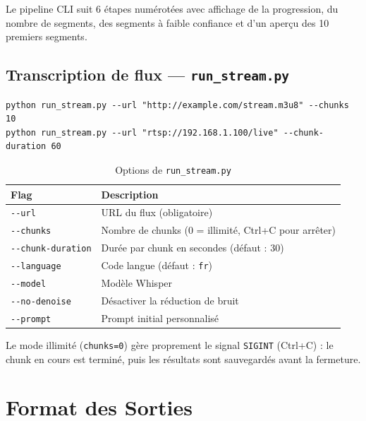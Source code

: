 \documentclass[12pt,a4paper]{report}
\begin{document}
Le pipeline CLI suit 6 étapes numérotées avec affichage de la progression, du nombre de segments, des segments à faible confiance et d'un aperçu des 10 premiers segments.

\section{Transcription de flux — \texttt{run\_stream.py}}

\begin{lstlisting}[style=bash, title=Utilisation de run\_stream.py]
python run_stream.py --url "http://example.com/stream.m3u8" --chunks 10
python run_stream.py --url "rtsp://192.168.1.100/live" --chunk-duration 60
\end{lstlisting}

\begin{table}[H]
    \centering
    \caption{Options de \texttt{run\_stream.py}}
    \label{tab:cli_stream}
    \begin{tabular}{@{} l p{8cm} @{}}
        \toprule
        \textbf{Flag} & \textbf{Description} \\
        \midrule
        \texttt{-{}-url} & URL du flux (obligatoire) \\
        \texttt{-{}-chunks} & Nombre de chunks (0 = illimité, Ctrl+C pour arrêter) \\
        \texttt{-{}-chunk-duration} & Durée par chunk en secondes (défaut : 30) \\
        \texttt{-{}-language} & Code langue (défaut : \texttt{fr}) \\
        \texttt{-{}-model} & Modèle Whisper \\
        \texttt{-{}-no-denoise} & Désactiver la réduction de bruit \\
        \texttt{-{}-prompt} & Prompt initial personnalisé \\
        \bottomrule
    \end{tabular}
\end{table}

Le mode illimité (\texttt{chunks=0}) gère proprement le signal \texttt{SIGINT} (Ctrl+C) : le chunk en cours est terminé, puis les résultats sont sauvegardés avant la fermeture.

\chapter{Format des Sorties}
\end{document}
